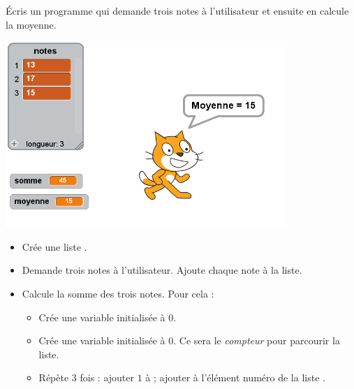 \documentclass[class=report,crop=false, 12pt]{standalone}
\begin{document}





\bigskip
\bigskip

\begin{activite}

Écris un programme qui demande trois notes à l'utilisateur et ensuite en calcule la moyenne.

\begin{center}
  \includegraphics[width=0.8\textwidth]{ecran-12-ex1} 
\end{center}

\begin{itemize}
  \item Crée une liste .
  \item Demande trois notes à l'utilisateur. Ajoute chaque note à la liste.
    
  \item Calcule la somme des trois notes. Pour cela :
  \begin{itemize}
    \item Crée une variable  initialisée à $0$.
    
    \item Crée une variable  initialisée à $0$. Ce sera le \emph{compteur} pour parcourir la liste. 
    
    \item Répète $3$ fois : ajouter $1$ à  ; ajouter à
     l'élément numéro  de la liste .    
  \end{itemize}
  

\end{itemize}
\end{activite}
\end{document}
